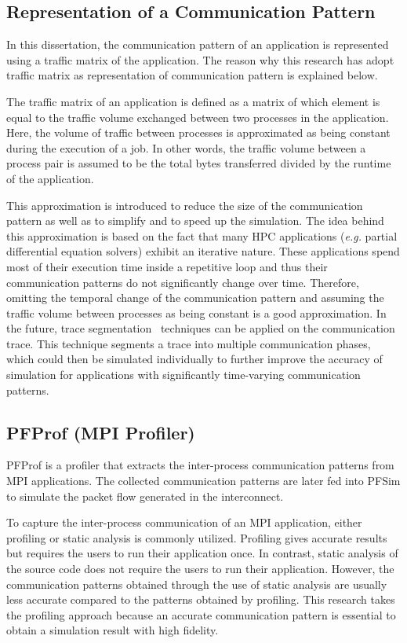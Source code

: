 \subsection{Representation of a Communication Pattern}

In this dissertation, the communication pattern of an application is
represented using a traffic matrix of the application. The reason why this
research has adopt traffic matrix as representation of communication pattern
is explained below.

The traffic matrix of an application is defined as a matrix of which element
is equal to the traffic volume exchanged between two processes in the
application. Here, the volume of traffic between processes is approximated as
being constant during the execution of a job. In other words, the traffic
volume between a process pair is assumed to be the total bytes transferred
divided by the runtime of the application.

This approximation is introduced to reduce the size of the communication
pattern as well as to simplify and to speed up the simulation. The idea behind
this approximation is based on the fact that many HPC applications
(\emph{e.g.} partial differential equation solvers) exhibit an iterative
nature. These applications spend most of their execution time inside a
repetitive loop and thus their communication patterns do not significantly
change over time. Therefore, omitting the temporal change of the communication
pattern and assuming the traffic volume between processes as being constant is
a good approximation. In the future, trace segmentation~\autocite{Alawneh2016}
techniques can be applied on the communication trace. This technique
segments a trace into multiple communication phases, which could then be
simulated individually to further improve the accuracy of simulation for
applications with significantly time-varying communication patterns.

\subsection{PFProf (MPI Profiler)}\label{sec:ii-pfprof}

PFProf is a profiler that extracts the inter-process communication patterns
from MPI applications. The collected communication patterns are later fed into
PFSim to simulate the packet flow generated in the interconnect.

To capture the inter-process communication of an MPI application, either
profiling or static analysis is commonly utilized. Profiling gives accurate
results but requires the users to run their application once. In contrast,
static analysis of the source code does not require the users to run their
application. However, the communication patterns obtained through the use of
static analysis are usually less accurate compared to the patterns obtained by
profiling. This research takes the profiling approach because an accurate
communication pattern is essential to obtain a simulation result with high
fidelity.

